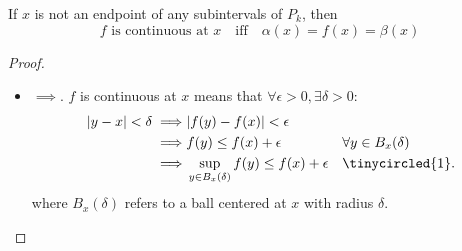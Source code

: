 \documentclass{article} %
\begin{document}
\begin{lemma}
If $x$ is not an endpoint of any subintervals of $P_k$, then 
\[ f \text{ is continuous at } x \quad \text{iff} \quad \alpha(x) = f(x) = \beta(x)\]	
\label{lemma:continuity_at_a_point_as_equality_of_upper_and_lower_functions}
\end{lemma}

\begin{proof}
\begin{itemize}
\item $\boxed{\implies}$.  $f$ is continuous at $x$ means that $\forall \epsilon>0, \exists \delta >0 :$
\begin{align*}
|y-x| < \delta \implies & |f(y) - f(x) | < \epsilon && \\
\implies &f(y) \leq f(x) + \epsilon  && \forall y \in B_x(\delta) \\ 
\implies &\sup_{y \in B_x(\delta)} f(y) \leq f(x) + \epsilon && \tinycircled{1}. 
\end{align*}
where $B_x(\delta)$ refers to a ball centered at $x$ with radius $\delta$.


\end{itemize}
\end{proof}
\end{document}
